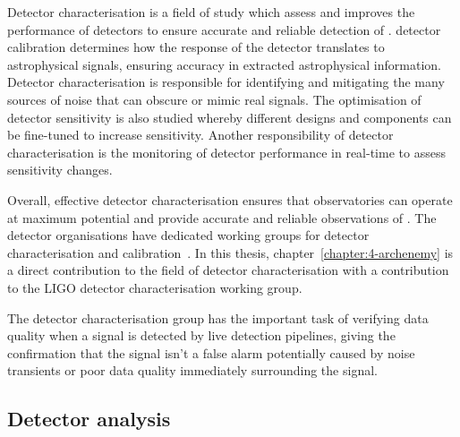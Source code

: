 Detector characterisation is a field of study which assess and improves the performance of \gwadj detectors to ensure accurate and reliable detection of \gws. \Gwadj detector calibration determines how the response of the detector translates to astrophysical signals, ensuring accuracy in extracted astrophysical information. Detector characterisation is responsible for identifying and mitigating the many sources of noise that can obscure or mimic real signals. The optimisation of detector sensitivity is also studied whereby different designs and components can be fine-tuned to increase sensitivity. Another responsibility of detector characterisation is the monitoring of detector performance in real-time to assess sensitivity changes.

Overall, effective detector characterisation ensures that \gwadj observatories can operate at maximum potential and provide accurate and reliable observations of \gws. The \gwadj detector organisations have dedicated working groups for detector characterisation and calibration~\cite{O2O3_DetChar:2021, VirgoDetChar:2023}. In this thesis, chapter~\ref{chapter:4-archenemy} is a direct contribution to the field of detector characterisation with a contribution to the LIGO detector characterisation working group.

The detector characterisation group has the important task of verifying data quality when a \gwadj signal is detected by live detection pipelines, giving the confirmation that the \gwadj signal isn't a false alarm potentially caused by noise transients or poor data quality immediately surrounding the \gwadj signal.

\subsection{\label{3:sec:detector-analysis}Detector analysis}


